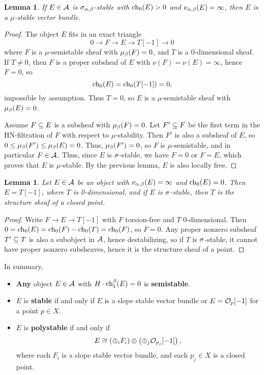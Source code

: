\documentclass[letterpaper,10pt]{article}
\newtheorem{lem}[thm]{Lemma}
\begin{document}
\begin{lem}
    If $E \in \mathcal{A}$ is $\sigma_{\alpha,\beta}$-stable with $\operatorname{\mathrm{ch}}_0(E) > 0$ and $\nu_{\alpha,\beta}(E) = \infty$, then $E$ is a $\mu$-stable vector bundle.
\end{lem}
\begin{proof}
    The object $E$ fits in an exact triangle
    \[ 0 \to F \to E \to T[-1] \to 0 \]
    where $F$ is a $\mu$-semistable sheaf with $\mu_\beta(F) = 0$, and $T$ is a 0-dimensional sheaf. If $T \neq 0$, then $F$ is a proper subsheaf of $E$ with $\nu(F) = \nu(E) = \infty$, hence $F = 0$, so
    \[ \operatorname{\mathrm{ch}}_0(E) = \operatorname{\mathrm{ch}}_0(T[-1]) = 0, \]
    impossible by assumption. Thus $T = 0$, so $E$ is a $\mu$-semistable sheaf with $\mu_\beta(E) = 0$. 
    
    Assume $F \subseteq E$ is a subsheaf with $\mu_\beta(F) = 0$. Let $F' \subseteq F$ be the first term in the HN-filtration of $F$ with respect to $\mu$-stability. Then $F'$ is also a subsheaf of $E$, so $0 \le \mu_\beta(F') \le \mu_\beta(E) = 0$. Thus, $\mu_\beta(F') = 0$, so $F$ is $\mu$-semistable, and in particular $F \in \mathcal{A}$. Thus, since $E$ is $\sigma$-stable, we have $F = 0$ or $F = E$, which proves that $E$ is $\mu$-stable. By the previous lemma, $E$ is also locally free.
\end{proof}

\begin{lem}
    Let $E \in \mathcal{A}$ be an object with $\nu_{\alpha, \beta}(E) = \infty$ and $\operatorname{\mathrm{ch}}_0(E) = 0$. Then $E = T[-1]$, where $T$ is 0-dimensional, and if $E$ is $\sigma$-stable, then $T$ is the structure sheaf of a closed point. 
\end{lem}
\begin{proof}
    Write $F \to E \to T[-1]$ with $F$ torsion-free and $T$ 0-dimensional. Then $0 = \operatorname{\mathrm{ch}}_0(E) = \operatorname{\mathrm{ch}}_0(F) - \operatorname{\mathrm{ch}}_0(T) = \operatorname{\mathrm{ch}}_0(F)$, so $F = 0$. Any proper nonzero subsheaf $T' \subseteq T$ is also a subobject in $\mathcal{A}$, hence destabilizing, so if $T$ is $\sigma$-stable, it cannot have proper nonzero subsheaves, hence it is the structure sheaf of a point.
\end{proof}
In summary, 
\begin{itemize}
    \item {\bf Any} object $E \in \mathcal{A}$ with $H\cdot \operatorname{\mathrm{ch}}_1^\beta(E) = 0$ is {\bf semistable}.
    \item $E$ is {\bf stable} if and only if $E$ is a slope stable vector bundle or $E = \mathcal{O}_p[-1]$ for a point $p \in X$.
    \item $E$ is {\bf polystable} if and only if 
    \[ E \cong \left(\oplus_i F_i\right) \oplus \left(\oplus_j \mathcal{O}_{p_j}[-1]\right), \]
    where each $F_i$ is a slope stable vector bundle, and each $p_j \in X$ is a closed point.
\end{itemize}
\end{document}
